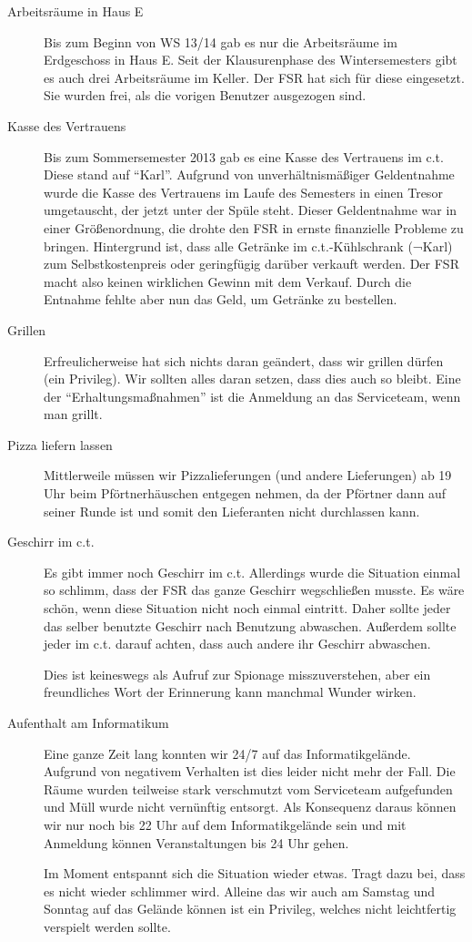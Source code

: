 \documentclass[a4paper,11pt]{scrartcl} %
\begin{document}
	\begin{description}
		\item[Arbeitsräume in Haus E] Bis zum Beginn von WS 13/14 gab es nur die Arbeitsräume im Erdgeschoss in Haus E. Seit der Klausurenphase des Wintersemesters gibt es auch drei Arbeitsräume im Keller. Der FSR hat sich für diese eingesetzt. Sie wurden frei, als die vorigen Benutzer ausgezogen sind.
		\item[Kasse des Vertrauens] Bis zum Sommersemester 2013 gab es eine Kasse des Vertrauens im c.t. Diese stand auf "`Karl"'. Aufgrund von unverhältnismäßiger Geldentnahme wurde die Kasse des Vertrauens im Laufe des Semesters in einen Tresor umgetauscht, der jetzt unter der Spüle steht. Dieser Geldentnahme war in einer Größenordnung, die drohte den FSR in ernste finanzielle Probleme zu bringen. Hintergrund ist, dass alle Getränke im c.t.-Kühlschrank (¬Karl) zum Selbstkostenpreis oder geringfügig darüber verkauft werden. Der FSR macht also keinen wirklichen Gewinn mit dem Verkauf. Durch die Entnahme fehlte aber nun das Geld, um Getränke zu bestellen.
		\item[Grillen] Erfreulicherweise hat sich nichts daran geändert, dass wir grillen dürfen (ein Privileg). Wir sollten alles daran setzen, dass dies auch so bleibt. Eine der "`Erhaltungsmaßnahmen"' ist die Anmeldung an das Serviceteam, wenn man grillt.
		\item[Pizza liefern lassen] Mittlerweile müssen wir Pizzalieferungen (und andere Lieferungen) ab 19 Uhr beim Pförtnerhäuschen entgegen nehmen, da der Pförtner dann auf seiner Runde ist und somit den Lieferanten nicht durchlassen kann.
		\item[Geschirr im c.t.] Es gibt immer noch Geschirr im c.t. Allerdings wurde die Situation einmal so schlimm, dass der FSR das ganze Geschirr wegschließen musste. Es wäre schön, wenn diese Situation nicht noch einmal eintritt. Daher sollte jeder das selber benutzte Geschirr nach Benutzung abwaschen. Außerdem sollte jeder im c.t. darauf achten, dass auch andere ihr Geschirr abwaschen.
		
		Dies ist keineswegs als Aufruf zur Spionage misszuverstehen, aber ein freundliches Wort der Erinnerung kann manchmal Wunder wirken.
		\item[Aufenthalt am Informatikum] Eine ganze Zeit lang konnten wir 24/7 auf das Informatikgelände. Aufgrund von negativem Verhalten ist dies leider nicht mehr der Fall. Die Räume wurden teilweise stark verschmutzt vom Serviceteam aufgefunden und Müll wurde nicht vernünftig entsorgt. Als Konsequenz daraus können wir nur noch bis 22 Uhr auf dem Informatikgelände sein und mit Anmeldung können Veranstaltungen bis 24 Uhr gehen.
		
		Im Moment entspannt sich die Situation wieder etwas. Tragt dazu bei, dass es nicht wieder schlimmer wird. Alleine das wir auch am Samstag und Sonntag auf das Gelände können ist ein Privileg, welches nicht leichtfertig verspielt werden sollte.
	\end{description}
\end{document}
